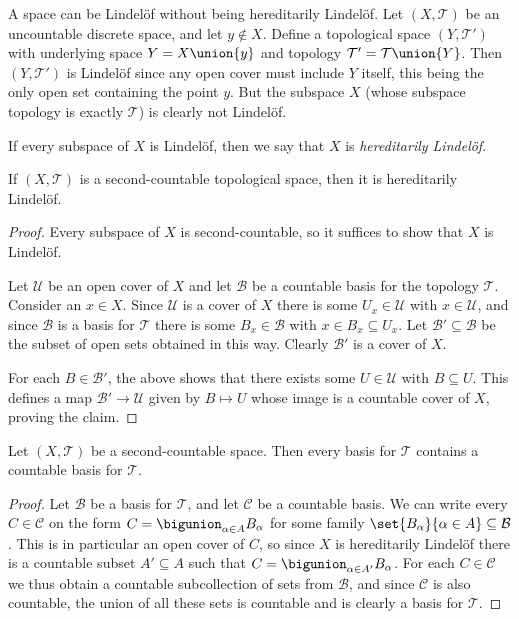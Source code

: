 \documentclass[article, a4paper, 11pt, oneside]{memoir}
\numberwithin{equation}{chapter}
\newcommand{\calT}{\mathcal{T}}
\newcommand{\calU}{\mathcal{U}}
\newcommand{\calB}{\mathcal{B}}
\newcommand{\calC}{\mathcal{C}}
\begin{document}
\begin{remark}
    A space can be Lindelöf without being hereditarily Lindelöf. Let $(X, \calT)$ be an uncountable discrete space, and let $y \not\in X$. Define a topological space $(Y, \calT')$ with underlying space $ Y = X \union \{y\}$ and topology $\calT' = \calT \union \{Y\}$. Then $(Y, \calT')$ is Lindelöf since any open cover must include $Y$ itself, this being the only open set containing the point $y$. But the subspace $X$ (whose subspace topology is exactly $\calT$) is clearly not Lindelöf.
\end{remark}
%
If every subspace of $X$ is Lindelöf, then we say that $X$ is \emph{hereditarily Lindelöf}.

\begin{proposition}
    If $(X,\calT)$ is a second-countable topological space, then it is hereditarily Lindelöf.
\end{proposition}

\begin{proof}
    Every subspace of $X$ is second-countable, so it suffices to show that $X$ is Lindelöf.
    
    Let $\calU$ be an open cover of $X$ and let $\calB$ be a countable basis for the topology $\calT$. Consider an $x \in X$. Since $\calU$ is a cover of $X$ there is some $U_x \in \calU$ with $x \in \calU$, and since $\calB$ is a basis for $\calT$ there is some $B_x \in \calB$ with $x \in B_x \subseteq U_x$. Let $\calB' \subseteq \calB$ be the subset of open sets obtained in this way. Clearly $\calB'$ is a cover of $X$.
    
    For each $B \in \calB'$, the above shows that there exists some $U \in \calU$ with $B \subseteq U$. This defines a map $\calB' \to \calU$ given by $B \mapsto U$ whose image is a countable cover of $X$, proving the claim.
\end{proof}


\begin{lemma}
    \label{thm:countable_basis}
    Let $(X, \calT)$ be a second-countable space. Then every basis for $\calT$ contains a countable basis for $\calT$.
\end{lemma}

\begin{proof}
    Let $\calB$ be a basis for $\calT$, and let $\calC$ be a countable basis. We can write every $C \in \calC$ on the form $C = \bigunion_{\alpha \in A} B_\alpha$ for some family $\set{B_\alpha}{\alpha \in A} \subseteq \calB$. This is in particular an open cover of $C$, so since $X$ is hereditarily Lindelöf there is a countable subset $A' \subseteq A$ such that $C = \bigunion_{\alpha \in A'} B_\alpha$. For each $C \in \calC$ we thus obtain a countable subcollection of sets from $\calB$, and since $\calC$ is also countable, the union of all these sets is countable and is clearly a basis for $\calT$.
\end{proof}
\end{document}
